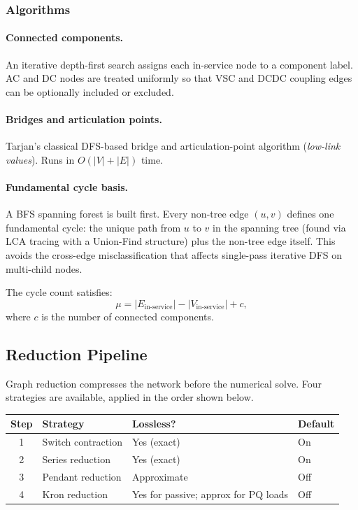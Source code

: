 \subsubsection{Algorithms}

\paragraph{Connected components.}
An iterative depth-first search assigns each in-service node to a component
label.  AC and DC nodes are treated uniformly so that VSC and DCDC coupling
edges can be optionally included or excluded.

\paragraph{Bridges and articulation points.}
Tarjan's classical DFS-based bridge and articulation-point algorithm
(\emph{low-link values}).  Runs in $O(|V|+|E|)$ time.

\paragraph{Fundamental cycle basis.}
A BFS spanning forest is built first.  Every non-tree edge $(u,v)$ defines
one fundamental cycle: the unique path from $u$ to $v$ in the spanning tree
(found via LCA tracing with a Union-Find structure) plus the non-tree edge
itself.  This avoids the cross-edge misclassification that affects
single-pass iterative DFS on multi-child nodes.

The cycle count satisfies:
\begin{equation}
  \mu = |E_{\text{in-service}}| - |V_{\text{in-service}}| + c,
  \label{eq:cyclomatic}
\end{equation}
where $c$ is the number of connected components.

\subsection{Reduction Pipeline}
\label{sec:graph-reduction}

Graph reduction compresses the network before the numerical solve.  Four
strategies are available, applied in the order shown below.

\begin{center}
\begin{tabular}{clll}
\hline\hline
\textbf{Step} & \textbf{Strategy} & \textbf{Lossless?} & \textbf{Default} \\
\hline
1 & Switch contraction   & Yes (exact)   & On \\
2 & Series reduction     & Yes (exact)   & On \\
3 & Pendant reduction    & Approximate   & Off \\
4 & Kron reduction       & Yes for passive; approx for PQ loads & Off \\
\hline\hline
\end{tabular}
\end{center}

